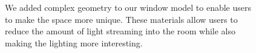 \documentclass[10pt,twocolumn,letterpaper]{article}
\begin{document}
\begin{figure}[t]
\caption{ We added complex geometry to our window model to enable
  users to make the space more unique.  These materials allow users to
  reduce the amount of light streaming into the room while also making
  the lighting more interesting.}
\vspace{-0.15in}
\label{FIGURE:screens}
\end{figure}
\end{document}
